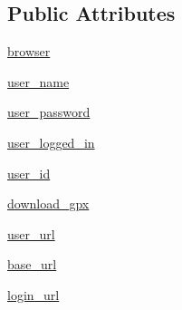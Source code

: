 \subsection*{Public Attributes}
\begin{DoxyCompactItemize}
\item 
\hyperlink{classpygce_1_1models_1_1bot_1_1_garmin_connect_bot_a60f14c87e68f9067680ba264205a0f5c}{browser}
\item 
\hyperlink{classpygce_1_1models_1_1bot_1_1_garmin_connect_bot_a259da08c172fe9b54bbb6b997ab840a7}{user\+\_\+name}
\item 
\hyperlink{classpygce_1_1models_1_1bot_1_1_garmin_connect_bot_af3d5c76d7e90a6aefe67926755d08c01}{user\+\_\+password}
\item 
\hyperlink{classpygce_1_1models_1_1bot_1_1_garmin_connect_bot_ae6d646cac47d9930a50be37aad133dea}{user\+\_\+logged\+\_\+in}
\item 
\hyperlink{classpygce_1_1models_1_1bot_1_1_garmin_connect_bot_a762d018855af5616f0519e08c354a7c7}{user\+\_\+id}
\item 
\hyperlink{classpygce_1_1models_1_1bot_1_1_garmin_connect_bot_a81b2ce5ff74592aeb9b1d8ebc236bfe4}{download\+\_\+gpx}
\item 
\hyperlink{classpygce_1_1models_1_1bot_1_1_garmin_connect_bot_a6afbf3f00e551c7a29de3b18e86f1eb2}{user\+\_\+url}
\item 
\hyperlink{classpygce_1_1models_1_1bot_1_1_garmin_connect_bot_a4ae874d8c53c9e6ff04fb7d72ba54f52}{base\+\_\+url}
\item 
\hyperlink{classpygce_1_1models_1_1bot_1_1_garmin_connect_bot_a9ae225cd44515fe8675b123b1907492e}{login\+\_\+url}
\end{DoxyCompactItemize}
